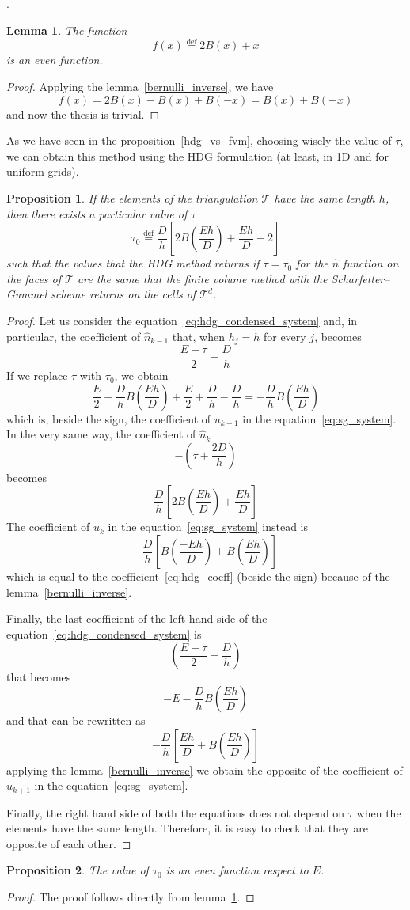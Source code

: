 \documentclass[a4paper,11pt, draft]{article}
\newtheorem{prop}{Proposition}
\newtheorem{lemma}{Lemma}[prop]
\newcommand{\Def}{\stackrel{\mathrm{def}}{=}}
\newcommand{\dualt}{\ensuremath{\mathcal{T}^d}}
\begin{document}
.
\begin{lemma}\label{bernulli_even}
 The function
 \[ f(x) \Def 2 B(x) + x \]
 is an even function.
\end{lemma}

\begin{proof}
Applying the lemma~\ref{bernulli_inverse}, we have
\[ f(x) = 2B(x) - B(x) + B(-x) = B(x) + B(-x)\]
and now the thesis is trivial.
\end{proof}

As we have seen in the proposition~\ref{hdg_vs_fvm}, choosing wisely the value of $\tau$, we can 
obtain this method using the HDG formulation (at least, in 1D and for uniform grids). 
\begin{prop}\label{hdg_vs_sg}
If the elements of the triangulation $\mathcal{T}$ have the same length $h$, then there exists 
a particular value of $\tau$
\[ \tau_0 \Def \frac{D}{h}\left[2B\left(\!\frac{Eh}{D}\!\right) + \frac{Eh}{D} - 2 \right] \]
such that the values that the HDG method returns if $\tau = \tau_0$ for the 
$\widehat{n}$ function on the faces of $\mathcal{T}$ are the same that the finite volume method 
 with the Scharfetter--Gummel scheme returns on the cells of \dualt.

\end{prop}

\begin{proof}
 Let us consider the equation~\ref{eq:hdg_condensed_system} and, in particular, the coefficient of 
$\widehat{n}_{k-1}$ that, when $h_j = h$ for every $j$, becomes
\[ \frac{E \! - \! \tau}{2} - \frac{D}{h} \]
If we replace $\tau$ with $\tau_0$, we obtain
\[ \frac{E}{2} - \frac{D}{h} B\left(\! \frac{Eh}{D}\!\right) + \frac{E}{2} + \frac{D}{h} - 
\frac{D}{h} = - \frac{D}{h} B\left(\! \frac{Eh}{D}\!\right) \]
which is, beside the sign, the coefficient of $u_{k-1}$ in the equation~\ref{eq:sg_system}.
In the very same way, the coefficient of $\widehat{n}_k$
\[ - \left( \tau + \frac{2D}{h} \right)\]
becomes
\begin{equation}\label{eq:hdg_coeff} \frac{D}{h}\left[2B\left(\!\frac{Eh}{D}\!\right) + 
\frac{Eh}{D} \right] \end{equation}
The coefficient of $u_k$ in the equation~\ref{eq:sg_system} instead is
\[ - \frac{D}{h}\left[B\left(\!\frac{-Eh}{D} \!\right) + B\left(\!\frac{Eh}{D} \!\right) \right]\]
which is equal to the coefficient~\ref{eq:hdg_coeff} (beside the sign) because of the 
lemma~\ref{bernulli_inverse}.

Finally, the last coefficient of the left hand side of the equation~\ref{eq:hdg_condensed_system} is
\[ \left(\frac{E - \tau}{2} - \frac{D}{h} \right)\]
that becomes
\[  -E - \frac{D}{h}B\left(\! \frac{Eh}{D}\!\right)\]
and that can be rewritten as
\[ - \frac{D}{h} \left[ \frac{Eh}{D} + B\left(\! \frac{Eh}{D} \! \right)\right]\]
applying the lemma~\ref{bernulli_inverse} we obtain the opposite of the coefficient of $u_{k + 1}$ 
in the equation~\ref{eq:sg_system}.

Finally, the right hand side of both the equations does not depend on $\tau$ when the elements have 
the same length. Therefore, it is easy to check that they are opposite of each other.
\end{proof}

\begin{prop}
The value of $\tau_0$ is an even function respect to $E$.
\end{prop}
\begin{proof}
 The proof follows directly from lemma~\ref{bernulli_even}.
\end{proof}
\end{document}
